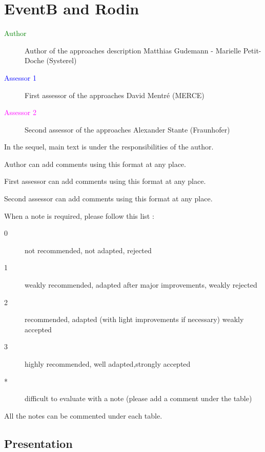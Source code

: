 \chapter{EventB and Rodin}
\label{chap:eventB}

\begin{description}
\item[\textcolor{green}{Author}] Author of the approaches description  Matthias Gudemann - Marielle Petit-Doche (Systerel)
\item[\textcolor{blue}{Assessor 1}] First assessor of the approaches David Mentré (MERCE)
\item[\textcolor{magenta}{Assessor 2}] Second assessor of the approaches Alexander Stante (Fraunhofer)
\end{description}

In the sequel, main text is under the responsibilities of the author.

\begin{author_comment}
Author can add comments using this format at any place.
\end{author_comment}

\begin{assessor1}
First assessor can add comments using this format at any place.
\end{assessor1}

\begin{assessor2}
Second assessor can add comments using this format at any place.
\end{assessor2}

When a note is required, please follow this list :
\begin{description}
\item[0] not recommended, not adapted, rejected
\item[1] weakly recommended, adapted after major improvements, weakly rejected
\item[2] recommended, adapted (with light improvements if necessary)  weakly accepted
\item[3] highly recommended, well adapted,strongly accepted
\item[*] difficult to evaluate with a note (please add a comment under the table)
\end{description}

All the notes can be commented under each table.

\section{Presentation}


